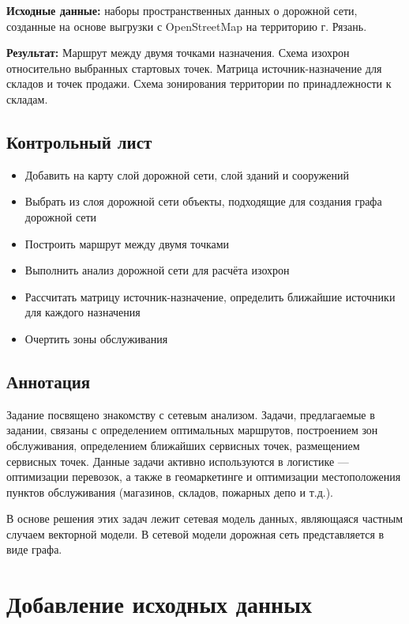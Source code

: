 \documentclass[
  12pt,
]{book}
\providecommand{\tightlist}{%
  \setlength{\itemsep}{0pt}\setlength{\parskip}{0pt}}
\begin{document}
\textbf{Исходные данные:} наборы пространственных данных о дорожной сети, созданные на основе выгрузки с OpenStreetMap на территорию г. Рязань.

\textbf{Результат:} Маршрут между двумя точками назначения. Схема изохрон относительно выбранных стартовых точек. Матрица источник-назначение для складов и точек продажи. Схема зонирования территории по принадлежности к складам.

\hypertarget{networks-control}{%
\subsection{Контрольный лист}\label{networks-control}}

\begin{itemize}
\tightlist
\item
  Добавить на карту слой дорожной сети, слой зданий и сооружений
\item
  Выбрать из слоя дорожной сети объекты, подходящие для создания графа дорожной сети
\item
  Построить маршрут между двумя точками
\item
  Выполнить анализ дорожной сети для расчёта изохрон
\item
  Рассчитать матрицу источник-назначение, определить ближайшие источники для каждого назначения
\item
  Очертить зоны обслуживания
\end{itemize}

\hypertarget{networks-annotation}{%
\subsection{Аннотация}\label{networks-annotation}}

Задание посвящено знакомству с сетевым анализом. Задачи, предлагаемые в задании, связаны с определением оптимальных маршрутов, построением зон обслуживания, определением ближайших сервисных точек, размещением сервисных точек. Данные задачи активно используются в логистике --- оптимизации перевозок, а также в геомаркетинге и оптимизации местоположения пунктов обслуживания (магазинов, складов, пожарных депо и т.д.).

В основе решения этих задач лежит сетевая модель данных, являющаяся частным случаем векторной модели. В сетевой модели дорожная сеть представляется в виде графа.

\hypertarget{networks-init}{%
\section{Добавление исходных данных}\label{networks-init}}
\end{document}
